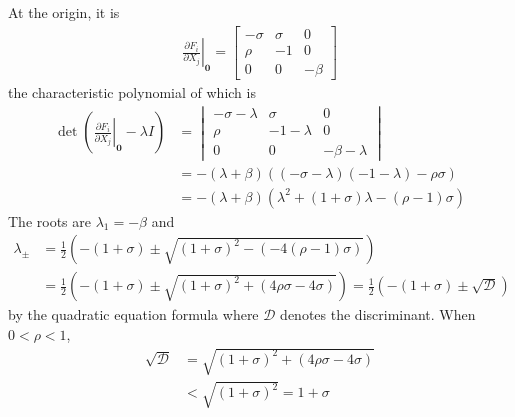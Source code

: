 At the origin, it is
\begin{align}
\left.\frac{\partial F_i}{\partial X_j}\right|_{\textbf{0}} =
\begin{bmatrix}
-\sigma & \sigma & 0 \\
\rho & -1 & 0 \\
0 & 0 & -\beta
\end{bmatrix}
\end{align}
the characteristic polynomial of which is
\begin{align}
\det(\left.\frac{\partial F_i}{\partial X_j}\right|_{\textbf{0}} - \lambda I) &= 
\begin{vmatrix}
-\sigma-\lambda & \sigma & 0 \\
\rho & -1-\lambda & 0 \\
0 & 0 & -\beta-\lambda
\end{vmatrix} \nonumber \\
&= -(\lambda + \beta)((-\sigma-\lambda)(-1-\lambda) - \rho\sigma) \nonumber \\
&= -(\lambda + \beta)(\lambda^2 + (1+\sigma)\lambda - (\rho-1)\sigma)
\end{align}
The roots are $\lambda_1 = -\beta$ and
\begin{align}
\lambda_{\pm} &= \frac{1}{2}\left(-(1+\sigma) \pm \sqrt{(1+\sigma)^2 - (-4(\rho-1)\sigma)}\right) \nonumber \\
&= \frac{1}{2}\left(-(1+\sigma) \pm \sqrt{(1+\sigma)^2 + (4\rho\sigma-4\sigma)}\right) = \frac{1}{2}(-(1+\sigma) \pm \sqrt{\mathcal{D}})
\end{align}
by the quadratic equation formula where $\mathcal{D}$ denotes the discriminant. When $0 < \rho < 1$, 
\begin{align*}
\sqrt{\mathcal{D}} &= \sqrt{(1+\sigma)^2 + (4\rho\sigma-4\sigma)} \\
&< \sqrt{(1+\sigma)^2} = 1+\sigma
\end{align*}
